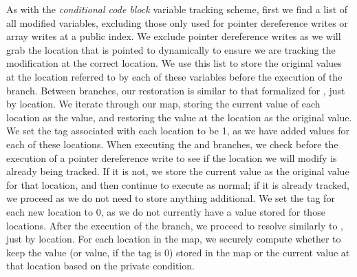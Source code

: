 As with the {\em conditional code block} variable  tracking scheme, first we find a list of all modified variables, excluding those only used for pointer dereference writes or array writes at a public index. 
We exclude pointer dereference writes as we will grab the location that is pointed to dynamically to ensure we are tracking the modification at the correct location.  
We use this list to store the original values at the location referred to by each of these variables before the execution of the  branch. 
Between branches, our restoration is similar to that formalized for \piccoC, just by location. 
We iterate through our map, storing the current value of each location as the  value, and restoring the value at the location as the original value. 
We set the tag associated with each location to be 1, as we have added  values for each of these locations. 
When executing the  and  branches, we check before the execution of a pointer dereference write to see if the location we will modify is already being tracked. 
If it is not, we store the current value as the original value for that location, and then continue to execute as normal; if it is already tracked, we proceed as we do not need to store anything additional. 
We set the tag for each new location to 0, as we do not currently have a  value stored for those locations.
After the execution of the  branch, we proceed to resolve similarly to \piccoC, just by location. 
For each location in the map, we securely compute whether to keep the  value (or  value, if the tag is 0) stored in the map or the current value at that location based on the private condition. 
















